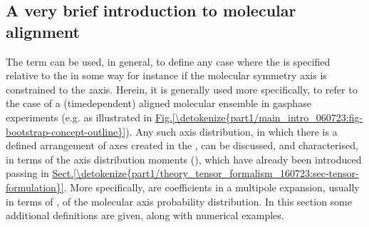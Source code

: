 \documentclass[letterpaper,table,10pt,english]{jupyterBook}
\begin{document}
\subsection{A very brief introduction to molecular alignment}
\label{\detokenize{part1/theory_molecular_alignment_170723:a-very-brief-introduction-to-molecular-alignment}}
\sphinxAtStartPar
The term {\hyperref[\detokenize{backmatter/glossary:term-molecular-alignment}]{}} can be used, in general, to define any case where the {\hyperref[\detokenize{backmatter/glossary:term-MF}]{}} is specified relative to the {\hyperref[\detokenize{backmatter/glossary:term-LF}]{}} in some way \sphinxhyphen{} for instance if the molecular symmetry axis is constrained to the {\hyperref[\detokenize{backmatter/glossary:term-LF}]{}} \(z\)\sphinxhyphen{}axis. Herein, it is generally used more specifically, to refer to the case of a (time\sphinxhyphen{}dependent) aligned molecular ensemble in gas\sphinxhyphen{}phase experiments (e.g. as illustrated in \hyperref[\detokenize{part1/main_intro_060723:fig-bootstrap-concept-outline}]{Fig.\@ \ref{\detokenize{part1/main_intro_060723:fig-bootstrap-concept-outline}}}). Any such axis distribution, in which there is a defined arrangement of axes created in the {\hyperref[\detokenize{backmatter/glossary:term-LF}]{}}, can be discussed, and characterised, in terms of the axis distribution moments ({\hyperref[\detokenize{backmatter/glossary:term-ADMs}]{}}), which have already been introduced passing in \hyperref[\detokenize{part1/theory_tensor_formalism_160723:sec-tensor-formulation}]{Sect.\@ \ref{\detokenize{part1/theory_tensor_formalism_160723:sec-tensor-formulation}}}. More specifically, {\hyperref[\detokenize{backmatter/glossary:term-ADMs}]{}} are coefficients in a multipole expansion, usually in terms of {\hyperref[\detokenize{backmatter/glossary:term-Wigner-rotation-matrix-elements}]{}}, of the molecular axis probability distribution. In this section some additional definitions are given, along with numerical examples.
\end{document}
